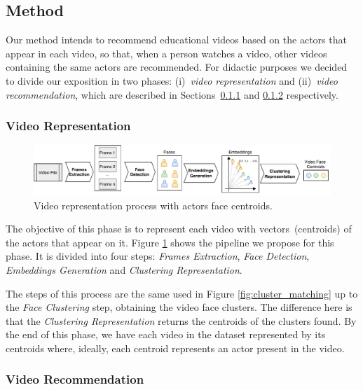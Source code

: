 \subsection{Method}
\label{sec:ism_method}

Our method intends to recommend educational videos based on the actors that appear in each video, so that, when a person watches a video, other videos containing the same actors are recommended.
For didactic purposes we decided to divide our exposition in two phases: (i)~\emph{video representation} and (ii)~\emph{video recommendation}, which are described in Sections~\ref{subsec:video_representation} and \ref{subsec:video_recommendation} respectively.

\subsubsection{Video Representation}
\label{subsec:video_representation}

\begin{figure}[!ht]
  \centering
  \includegraphics[width=\linewidth]{img/ism/video_clustering_line.pdf}
  \caption{Video representation process with actors face centroids. }
  \label{fig:video_clustering}
\end{figure}

The objective of this phase is to represent each video with vectors~(centroids) of the actors that appear on it. 
Figure \ref{fig:video_clustering} shows the pipeline we propose for this phase.
It is divided into four steps: \emph{Frames Extraction}, \emph{Face Detection}, \emph{Embeddings Generation} and \emph{Clustering Representation}.

The steps of this process are the same used in Figure \ref{fig:cluster_matching} up to the \emph{Face Clustering} step, obtaining the video face clusters.
The difference here is that the \emph{Clustering Representation} returns the centroids of the clusters found.
By the end of this phase, we have each video in the dataset represented by its centroids where, ideally, each centroid represents an actor present in the video.


\subsubsection{Video Recommendation}
\label{subsec:video_recommendation}

